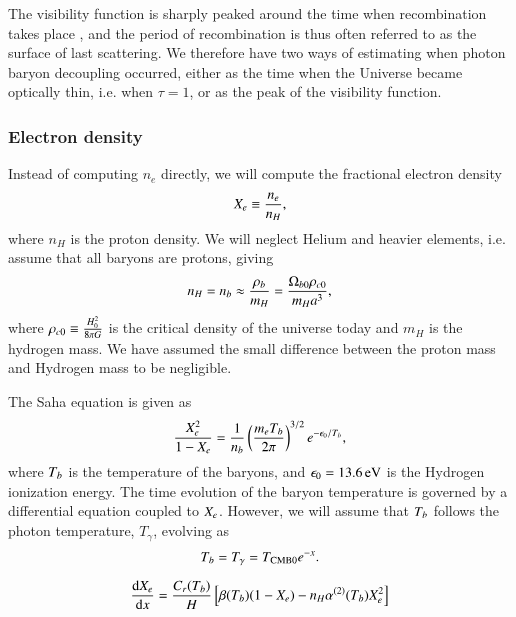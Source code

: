 The visibility function is sharply peaked around the time when recombination takes place , and the period of recombination is thus often referred to as the surface of last scattering. We therefore have two ways of estimating when photon baryon decoupling occurred, either as the time when the Universe became optically thin, i.e. when $\tau=1$, or as the peak of the visibility function.   

\subsubsection{Electron density } \label{sssec:M2_electron_density}
Instead of computing $n_e$ directly, we will compute the fractional electron density
\begin{equation} \label{eq:M2:theory:X_e_definition}
    X_e \equiv \frac{n_e}{n_H},
\end{equation}
where $n_H$ is the proton density. We will neglect Helium and heavier elements, i.e. assume that all baryons are protons, giving  
\begin{equation} \label{eq:M2:theory:helium_baryon_number_density}
    n_H=n_b \approx \frac{\rho_b}{m_H} = \frac{\Omega_{b0} \rho_{c0}}{m_H a^3},
\end{equation}
where $\rho_{c0}\equiv \frac{ H_0^2}{8\pi G}$ is the critical density of the universe today and $m_H$ is the hydrogen mass. We have assumed the small difference between the proton mass and Hydrogen mass to be negligible.


The Saha equation is given as 
\begin{equation} \label{eq:M2:theory:saha_equation}
    \frac{X_e^2}{1-X_e} = \frac{1}{n_b} \left( \frac{m_e T_b}{2\pi} \right)^{3/2} e^{-\epsilon_0 / T_b},
\end{equation}
where $T_b$ is the temperature of the baryons, and $\epsilon_0=13.6\,\mathrm{eV}$ is the Hydrogen ionization energy. The time evolution of the baryon temperature is governed by a differential equation coupled to $X_e$. However, we will assume that $T_b$ follows the photon temperature, $T_\gamma$, evolving as 
\begin{equation}
    T_b = T_\gamma = T_\mathrm{CMB0} e^{-x}.
\end{equation}



\begin{equation}
    \dv{X_e}{x} = \frac{C_r(T_b)}{H}\left[ \beta(T_b)(1-X_e) - n_H \alpha^{(2)}(T_b) X_e^2  \right]
\end{equation}

